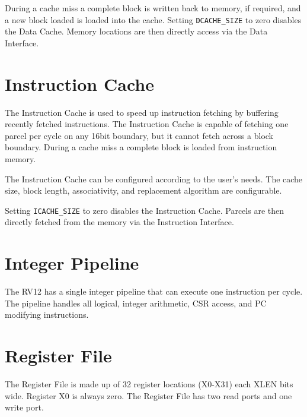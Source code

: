 During a cache miss a complete block is written back to memory, if
required, and a new block loaded is loaded into the cache. Setting
\texttt{DCACHE\_SIZE} to zero disables the Data Cache. Memory locations
are then directly access via the Data Interface.

\section{Instruction Cache}\label{instruction-cache}

The Instruction Cache is used to speed up instruction fetching by
buffering recently fetched instructions. The Instruction Cache is
capable of fetching one parcel per cycle on any 16bit boundary, but it
cannot fetch across a block boundary. During a cache miss a complete
block is loaded from instruction memory.

The Instruction Cache can be configured according to the user's needs.
The cache size, block length, associativity, and replacement algorithm
are configurable.

Setting \texttt{ICACHE\_SIZE} to zero disables the Instruction Cache. Parcels
are then directly fetched from the memory via the Instruction Interface.

\section{Integer Pipeline}\label{integer-pipeline}

The RV12 has a single integer pipeline that can execute one instruction per
cycle. The pipeline handles all logical, integer arithmetic, CSR access, and PC
modifying instructions.


\section{Register File}\label{register-file}

The Register File is made up of 32 register locations (X0-X31) each XLEN
bits wide. Register X0 is always zero. The Register File has two read
ports and one write port.
